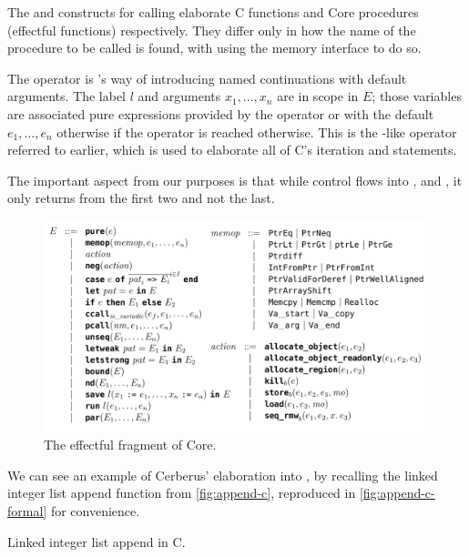 The  and  constructs for calling %
elaborate C functions and Core procedures (effectful functions) respectively.
They differ only in how the name of the procedure to be called is found, with
 using the memory interface to do so. %

The  operator is 's way of introducing named %
continuations with default arguments. The label $l$ and arguments $x_1, \ldots,
x_n$ are in scope in $E$; those variables are associated pure expressions
provided by the  operator or with the default $e_1, \ldots, %
e_n$ otherwise if the operator is reached otherwise. This is the -like
operator referred to earlier, which is used to elaborate all of C's iteration
and  statements.

The important aspect from our purposes is that while control flows into
,  and , it %
only returns from the first two and not the last.

\begin{figure}[tp]
    \ContinuedFloat{}
    \includegraphics{figures/effectful-core.png}
    \caption{The effectful fragment of Core.}\label{fig:effectful-core-grammar}
\end{figure}

We can see an example of Cerberus' elaboration into , by recalling the
linked integer list append function from \cref{fig:append-c}, reproduced
in \cref{fig:append-c-formal} for convenience.

\begin{marginfigure}
    \centering
    \caption{Linked integer list append in C.}\label{fig:append-c-formal}
\end{marginfigure}%


